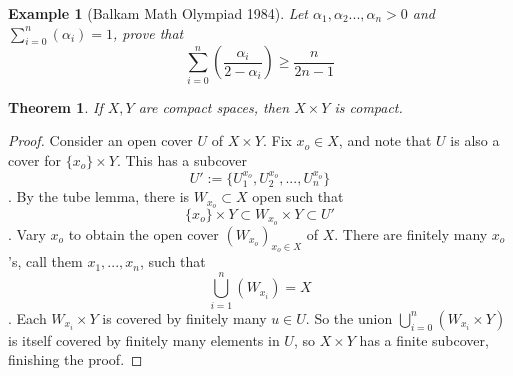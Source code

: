 \documentclass{article}
\newtheorem{theorem}{Theorem}
\newtheorem{example}{Example}
\begin{document}
\begin{example}[Balkam Math Olympiad 1984]
	Let $\alpha_1,\alpha_2...,\alpha_n>0$ and $\sum_{i=0}^n(\alpha_i)=1$, prove that $$\sum_{i=0}^n (\frac{\alpha_i}{2-\alpha_i})\geq\frac{n}{2n-1}$$
\end{example}
\begin{theorem}
	If $X,Y$ are compact spaces, then $X\times Y$ is compact.
\end{theorem}
\begin{proof}
	Consider an open cover $U$ of $X\times Y$.  Fix $x_o\in X$, and note that $U$ is also a cover for $\{x_o\}\times Y$.  This has a subcover $$U':=\{U_1^{x_o},U_2^{x_o},...,U_n^{x_o}\}$$.  By the tube lemma, there is $W_{x_o}\subset X$ open such that $$\{x_o\}\times Y\subset W_{x_o}\times Y\subset U'$$.  Vary $x_o$ to obtain the open cover $(W_{x_o})_{x_o\in X}$ of $X$.  There are finitely many $x_o$'s, call them $x_1,...,x_n$, such that $$\bigcup_{i=1}^n(W_{x_i})=X$$.  Each $W_{x_i}\times Y$ is covered by finitely many $u\in U$.  So the union $\bigcup_{i=0}^n(W_{x_i}\times Y)$ is itself covered by finitely many elements in $U$, so $X\times Y$ has a finite subcover, finishing the proof.
\end{proof}
 
\end{document}
